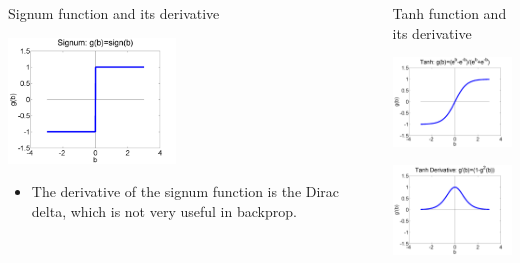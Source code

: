 \documentclass{beamer}
\begin{document}
\begin{frame}
  \begin{columns}[t]
    \column{2.25in}
    \begin{block}{Signum function and its derivative}
      \centerline{\includegraphics[width=1.75in]{../lec07/figs/nn_signum.png}}
      \begin{itemize}
      \item The derivative of the signum function is the Dirac
        delta, which is not very useful in backprop.
      \end{itemize}
    \end{block}
    \column{2.25in}
    \begin{block}{Tanh function and its derivative}
      \centerline{\includegraphics[width=1.75in]{../lec07/figs/nn_tanh.png}}
      \centerline{\includegraphics[width=1.75in]{../lec07/figs/nn_tanhprime.png}}
    \end{block}
  \end{columns}
\end{frame}
\end{document}
